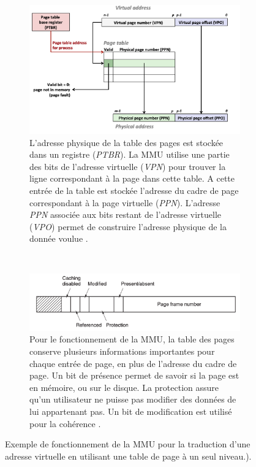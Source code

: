 \begin{figure}
    \centering
    \begin{subfigure}[b]{\linewidth}\centering
        \includegraphics[width=0.7\linewidth]{images/memory_page_table_nbits.png}
        \caption{L'adresse physique de la table des pages est stockée dans un registre (\textit{PTBR}). La MMU utilise une partie des bits de l'adresse virtuelle (\textit{VPN}) pour trouver la ligne correspondant à la page dans cette table. A cette entrée de la table est stockée l'adresse du cadre de page correspondant à la page virtuelle (\textit{PPN}). L'adresse \textit{PPN} associée aux bits restant de l'adresse virtuelle (\textit{VPO}) permet de construire l'adresse physique de la donnée voulue \cite{Mowry2012}.}
        \label{pic:memory_page_table_nbits}
    \end{subfigure}
    ~ %
    \begin{subfigure}[b]{\linewidth}\centering
        \includegraphics[width=0.7\linewidth]{images/memory_page_table_entry.png}
        \caption{Pour le fonctionnement de la MMU, la table des pages conserve plusieurs informations importantes pour chaque entrée de page, en plus de l'adresse du cadre de page. Un bit de présence permet de savoir si la page est en mémoire, ou sur le disque. La protection assure qu'un utilisateur ne puisse pas modifier des données de lui appartenant pas. Un bit de modification est utilisé pour la cohérence \cite{tanenbaum2008systemes}.}
        \label{pic:memory_page_table_entry}
    \end{subfigure}
    

    \caption{Exemple de fonctionnement de la MMU pour la traduction d'une adresse virtuelle en utilisant une table de page à un seul niveau.). }\label{fig:memory_page_table_un_niveau}
\end{figure}


